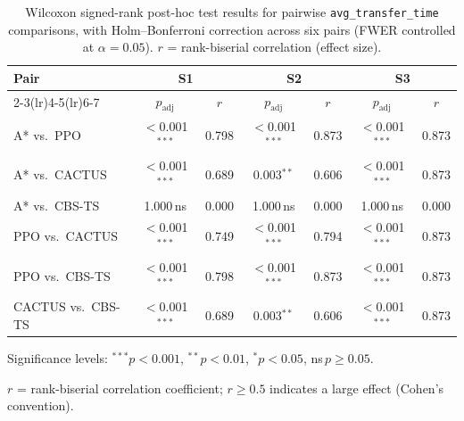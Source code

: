 \begin{table}[htbp]
  \centering
  \caption{Wilcoxon signed-rank post-hoc test results for pairwise
           \texttt{avg\_transfer\_time} comparisons, with Holm--Bonferroni correction
           across six pairs (FWER controlled at $\alpha{=}0.05$).
           $r$ = rank-biserial correlation (effect size).}
  \label{tab:6}
  \small
  \begin{threeparttable}
    \begin{tabular}{lcccccc}
      \toprule
      \multirow{2}{*}{\textbf{Pair}}
        & \multicolumn{2}{c}{\textbf{S1}}
        & \multicolumn{2}{c}{\textbf{S2}}
        & \multicolumn{2}{c}{\textbf{S3}} \\
      \cmidrule(lr){2-3}\cmidrule(lr){4-5}\cmidrule(lr){6-7}
        & $p_{\mathrm{adj}}$ & $r$
        & $p_{\mathrm{adj}}$ & $r$
        & $p_{\mathrm{adj}}$ & $r$ \\
      \midrule
      A* vs.\ PPO
        & $<$0.001$^{***}$ & 0.798
        & $<$0.001$^{***}$ & 0.873
        & $<$0.001$^{***}$ & 0.873 \\
      A* vs.\ CACTUS
        & $<$0.001$^{***}$ & 0.689
        & 0.003$^{**}$     & 0.606
        & $<$0.001$^{***}$ & 0.873 \\
      A* vs.\ CBS-TS
        & 1.000\,ns        & 0.000
        & 1.000\,ns        & 0.000
        & 1.000\,ns        & 0.000 \\
      PPO vs.\ CACTUS
        & $<$0.001$^{***}$ & 0.749
        & $<$0.001$^{***}$ & 0.794
        & $<$0.001$^{***}$ & 0.873 \\
      PPO vs.\ CBS-TS
        & $<$0.001$^{***}$ & 0.798
        & $<$0.001$^{***}$ & 0.873
        & $<$0.001$^{***}$ & 0.873 \\
      CACTUS vs.\ CBS-TS
        & $<$0.001$^{***}$ & 0.689
        & 0.003$^{**}$     & 0.606
        & $<$0.001$^{***}$ & 0.873 \\
      \bottomrule
    \end{tabular}
    \begin{tablenotes}
      \footnotesize
      \item Significance levels: $^{***}p{<}0.001$,\; $^{**}p{<}0.01$,\;
            $^{*}p{<}0.05$,\; ns\,$p{\geq}0.05$.
      \item $r$ = rank-biserial correlation coefficient; $r{\geq}0.5$ indicates
            a large effect (Cohen's convention).

\end{tablenotes}
\end{threeparttable}
\end{table}
